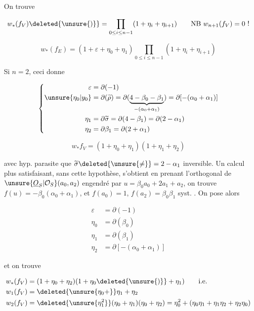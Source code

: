 On trouve

\[w_*(f_V)\deleted{\unsure{)}}=\prod_{0\leq i\leq n-1}(1+\eta_i+\eta_{i+1})\qquad\text{NB } w_{n+1}(f_V)=0\ !\]

\[w_*(f_E)=(1+\varepsilon+\eta_0+\eta_1)\prod_{0\leq i\leq n-1}(1+\eta_i+\eta_{i+1})\]


Si $n=2$, ceci donne

\[\left\{\begin{aligned}\varepsilon&=\partial(-1)\\ \unsure{\eta_0|y_0}&=\partial(\widetilde\rho)=\partial(\underbrace{4-\beta_0-\beta_1}_{-(\alpha_0+\alpha_1)})=\partial[-(\alpha_0+\alpha_1)]\\ \eta_1&=\partial\widetilde\sigma=\partial(4-\beta_1)=\partial(2-\alpha_1)\\ \eta_2&=\partial\beta_1=\partial(2+\alpha_1)\end{aligned}\right.\]

\[w_* f_V=(1+\eta_0+\eta_1)(1+\eta_1+\eta_2)\]

avec hyp. parasite que $\widetilde\sigma\deleted{\unsure{\ne}}=2-\alpha_1$   inversible. Un calcul plus satisfaisant, sans cette hypothèse, s'obtient en prenant l'orthogonal de $\unsure{\underline O_S|\mathcal O_S}(a_0,a_2)$ engendré par $u=\beta_0 a_0+2a_1+a_2$, on trouve $f(u)=-\beta_0(\alpha_0+\alpha_1)$, et $f(a_0)=1$, $f(a_2)=\beta_0\beta_1$ syst. . On pose alors

\[\begin{aligned}\varepsilon&=\partial(-1)\\\eta_0&=\partial(\beta_0)\\\eta_1&=\partial(\beta_1)\\\eta_2&=\partial[-(\alpha_0+\alpha_1)]\end{aligned}\]

et on trouve

\[\begin{aligned}w_*(f_V)&=(1+\eta_0+\eta_2)(1+\eta_0\deleted{\unsure{)}}+\eta_1)\qquad\text{i.e.}\\w_1(f_V)&=\deleted{\unsure{\eta_0+}}\eta_1+\eta_2\\w_2(f_V)&=\deleted{\unsure{\eta_1^2}}(\eta_0+\eta_1)(\eta_0+\eta_2)=\eta_0^2+(\eta_0\eta_1+\eta_1\eta_2+\eta_2\eta_0)\end{aligned}\]


